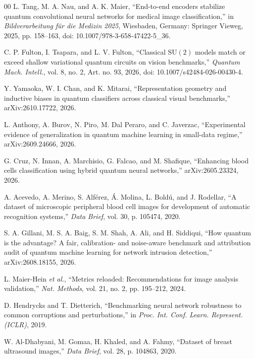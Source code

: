 \documentclass{ieeeaccess}
\begin{document}
\begin{thebibliography}{00}
 L. Tang, M. A. Nau, and A. K. Maier, ``End-to-end encoders stabilize quantum convolutional neural networks for medical image classification,'' in \emph{Bildverarbeitung f\"ur die Medizin 2025}, Wiesbaden, Germany: Springer Vieweg, 2025, pp. 158--163, doi: 10.1007/978-3-658-47422-5\_36.

 C. P. Fulton, I. Tsapara, and L. V. Fulton, ``Classical $\mathrm{SU}(2)$ models match or exceed shallow variational quantum circuits on vision benchmarks,'' \emph{Quantum Mach. Intell.}, vol. 8, no. 2, Art. no. 93, 2026, doi: 10.1007/s42484-026-00430-4.

 Y. Yamaoka, W. I. Chan, and K. Mitarai, ``Representation geometry and inductive biases in quantum classifiers across classical visual benchmarks,'' arXiv:2610.17722, 2026.

 L. Anthony, A. Burov, N. Piro, M. Dal Peraro, and C. Javerzac, ``Experimental evidence of generalization in quantum machine learning in small-data regime,'' arXiv:2609.24666, 2026.

 G. Cruz, N. Innan, A. Marchisio, G. Falcao, and M. Shafique, ``Enhancing blood cells classification using hybrid quantum neural networks,'' arXiv:2605.23324, 2026.

 A. Acevedo, A. Merino, S. Alf\'erez, \'A. Molina, L. Bold\'u, and J. Rodellar, ``A dataset of microscopic peripheral blood cell images for development of automatic recognition systems,'' \emph{Data Brief}, vol. 30, p. 105474, 2020.

 S. A. Gillani, M. S. A. Baig, S. M. Shah, A. Ali, and H. Siddiqui, ``How quantum is the advantage? A fair, calibration- and noise-aware benchmark and attribution audit of quantum machine learning for network intrusion detection,'' arXiv:2608.18155, 2026.

 L. Maier-Hein \emph{et al.}, ``Metrics reloaded: Recommendations for image analysis validation,'' \emph{Nat. Methods}, vol. 21, no. 2, pp. 195--212, 2024.

 D. Hendrycks and T. Dietterich, ``Benchmarking neural network robustness to common corruptions and perturbations,'' in \emph{Proc. Int. Conf. Learn. Represent. (ICLR)}, 2019.

 W. Al-Dhabyani, M. Gomaa, H. Khaled, and A. Fahmy, ``Dataset of breast ultrasound images,'' \emph{Data Brief}, vol. 28, p. 104863, 2020.


\end{thebibliography}
\end{document}
